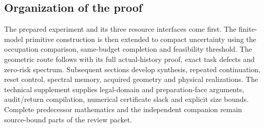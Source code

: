 \subsection*{Organization of the proof}
The prepared experiment and its three resource interfaces come first. The finite-model primitive construction is then extended to compact uncertainty using the occupation comparison, same-budget completion and feasibility threshold. The geometric route follows with its full actual-history proof, exact task defects and zero-risk spectrum. Subsequent sections develop synthesis, repeated continuation, reset control, spectral memory, acquired geometry and physical realizations. The technical supplement supplies legal-domain and preparation-face arguments, audit/return compilation, numerical certificate slack and explicit size bounds. Complete predecessor mathematics and the independent companion remain source-bound parts of the review packet.
